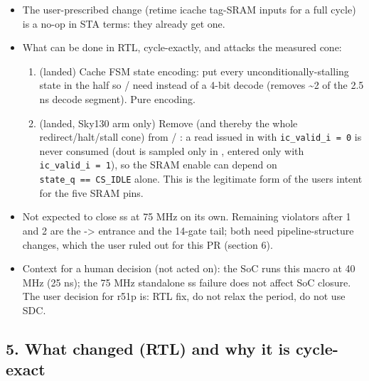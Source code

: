 \begin{record}

\begin{itemize}
\tightlist
\item
  The user-prescribed change (retime icache tag-SRAM inputs for a full
  cycle) is a no-op in STA terms: they already get one.
\item
  What can be done in RTL, cycle-exactly, and attacks the measured cone:

  \begin{enumerate}
  \def\labelenumi{\arabic{enumi}.}
  \tightlist
  \item
    (landed) Cache FSM state encoding: put every
    unconditionally-stalling state in the  half so
     /  need  instead
    of a 4-bit decode (removes \textasciitilde2 of the 2.5 ns decode
    segment). Pure encoding.
  \item
    (landed, Sky130 arm only) Remove  (and thereby the
    whole redirect/\allowbreak{}halt/\allowbreak{}stall cone) from
     / : a read issued in 
    with
    \texttt{ic\_\allowbreak{}valid\_\allowbreak{}i\ =\allowbreak{}\ 0}
    is never consumed (dout is sampled only in ,
    entered only with
    \texttt{ic\_\allowbreak{}valid\_\allowbreak{}i\ =\allowbreak{}\ 1}),
    so the SRAM enable can depend on
    \texttt{state\_\allowbreak{}q\ =\allowbreak{}=\allowbreak{}\ CS\_\allowbreak{}IDLE}
    alone. This is the legitimate form of the user\textquotesingle s
    intent for the five SRAM pins.
  \end{enumerate}
\item
  Not expected to close ss at 75 MHz on its own. Remaining violators
  after 1 and 2 are the  -\textgreater{}
   entrance and the 14-gate tail; both need
  pipeline-structure changes, which the user ruled out for this PR
  (section 6).
\item
  Context for a human decision (not acted on): the SoC runs this macro
  at 40 MHz (25 ns); the 75 MHz standalone ss failure does not affect
  SoC closure. The user decision for r51p is: RTL fix, do not relax the
  period, do not use SDC.
\end{itemize}

\end{record}

\subsection{5. What changed (RTL) and why it is cycle-exact}\label{cr:defect:sky130-cpu-ss-setup-r51p:5-what-changed-rtl-and-why-it-is-cycle-exact}


